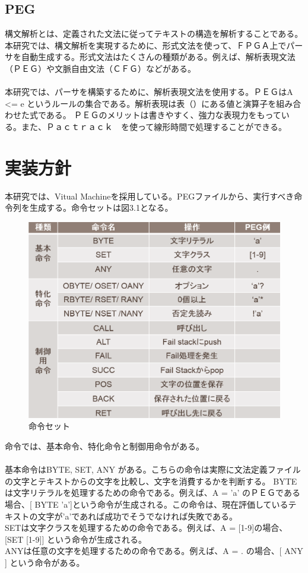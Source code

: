 \documentclass[12pt,oneside]{report}
\begin{document}
\section{PEG}
構文解析とは、定義された文法に従ってテキストの構造を解析することである。本研究では、構文解析を実現するために、形式文法を使って、ＦＰＧＡ上でパーサを自動生成する。形式文法はたくさんの種類がある。例えば、解析表現文法（ＰＥＧ）や文脈自由文法（ＣＦＧ）などがある。\\
\\
本研究では、パーサを構築するために、解析表現文法を使用する。ＰＥＧはA <= e というルールの集合である。解析表現は表（）にある値と演算子を組み合わせた式である。
ＰＥＧのメリットは書きやすく、強力な表現力をもっている。また、Ｐａｃｔｒａｃｋ　を使って線形時間で処理することができる。
\\

\chapter{実装方針}
本研究では、Vitual Machineを採用している。PEGファイルから、実行すべき命令列を生成する。命令セットは図3.1となる。

\begin{figure}[t]
    \begin{center}
        \includegraphics[width=130mm]{./fig/Ist_list}
       \caption{命令セット}
        \label{Ist_list}
    \end{center}
\end{figure}

命令では、基本命令、特化命令と制御用命令がある。\\
\\
基本命令はBYTE, SET, ANY がある。こちらの命令は実際に文法定義ファイルの文字とテキストからの文字を比較し、文字を消費するかを判断する。
BYTEは文字リテラルを処理するための命令である。例えば、A =  'a' のＰＥＧである場合、[ BYTE 'a']という命令が生成される。この命令は、現在評価しているテキストの文字が'a'であれば成功でそうでなければ失敗である。\\
SETは文字クラスを処理するための命令である。例えば、A = [1-9]の場合、[SET [1-9]] という命令が生成される。\\
ANYは任意の文字を処理するための命令である。例えば、A = . の場合、[ ANY ] という命令がある。\\
\end{document}
